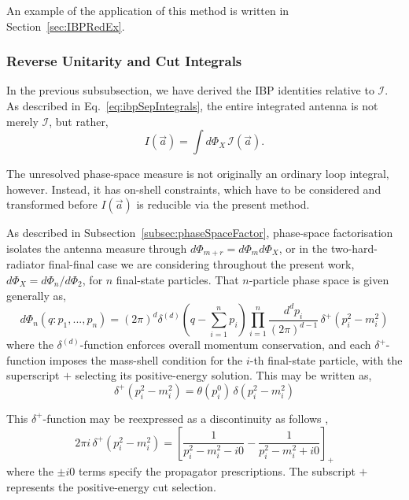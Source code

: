 An example of the application of this method is written in Section~\ref{sec:IBPRedEx}.

\subsubsection{Reverse Unitarity and Cut Integrals}\label{subsubsec:revUnit}

In the previous subsubsection, we have derived the IBP identities relative to
$\mathcal I$. As described in Eq.~\eqref{eq:ibpSepIntegrals}, the entire integrated 
antenna is not merely $\mathcal I$, but rather,
\begin{equation}
    I(\vec a) = \int d\Phi_X\,\mathcal I(\vec a).
\end{equation}

The unresolved phase-space measure is not originally an ordinary loop integral, 
however. Instead, it has on-shell constraints, which have to be considered and
transformed before $I(\vec a)$ is reducible via the present method.

As described in Subsection~\ref{subsec:phaseSpaceFactor}, phase-space factorisation
isolates the antenna measure through $d\Phi_{m+r} = d\Phi_m d\Phi_X$, or in the
two-hard-radiator final-final case we are considering throughout the present work,
$d\Phi_X = d\Phi_n/d\Phi_2$, for $n$ final-state particles. 
That $n$-particle phase space is given generally
as,
\begin{equation}\label{eq:nParticlePS}
    d\Phi_n(q:p_1,...,p_n) = (2\pi)^d \delta^{(d)}\!\left(q-\sum_{i=1}^n p_i\right)\prod_{i=1}^n\frac{d^dp_i}{(2\pi)^{d-1}}\,\delta^+\!\left(p_i^2-m_i^2\right)
\end{equation}
where the $\delta^{(d)}$-function enforces overall momentum conservation, and each
$\delta^+$-function imposes the mass-shell condition for the $i$-th final-state
particle, with the superscript $+$ selecting its positive-energy solution. This may be written as,
\begin{equation}
    \delta^+\!\left(p_i^2-m_i^2\right) = \theta\!\left(p_i^0\right)\,\delta\!\left(p_i^2-m_i^2\right)
\end{equation}

This $\delta^+$-function may be reexpressed as a discontinuity as follows 
\cite{GehrmannDeRidder0311276,Anastasiou:2002yz},
\begin{equation}
    2\pi i\,\delta^+\!\left(p_i^2-m_i^2\right) = \left[\frac1{p_i^2-m_i^2-i0}-\frac1{p_i^2-m_i^2+i0}\right]_+
\end{equation}
where the $\pm i0$ terms specify the propagator prescriptions. The subscript $+$ 
represents the positive-energy cut selection.

